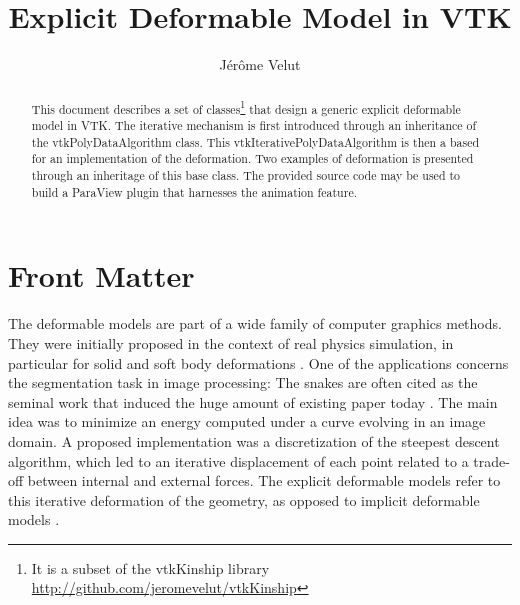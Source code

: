 \documentclass{InsightArticle}
\title{Explicit Deformable Model in VTK}
\author{J\'er\^ome Velut}
\newcommand{\IJhandlerIDnumber}{3251}
\begin{document}
%
% 
\IJhandlefooter{\IJhandlerIDnumber}


\ifpdf
\else
\fi


\maketitle


\ifhtml
\chapter*{Front Matter\label{front}}
\fi


\begin{abstract}
\noindent
This document describes a set of classes\footnote{It is a subset of the
vtkKinship library \url{http://github.com/jeromevelut/vtkKinship}} that 
design a generic explicit deformable model in VTK. The iterative mechanism
is first introduced through an inheritance of the vtkPolyDataAlgorithm class. 
This vtkIterativePolyDataAlgorithm is then a based for an implementation of the
deformation. Two examples of deformation is presented through an inheritage of
this base class. The provided source code may be used to build a ParaView plugin
that harnesses the animation feature.
\end{abstract}

\IJhandlenote{\IJhandlerIDnumber}

\tableofcontents

The deformable models are part of a wide family of computer graphics methods.
They were initially proposed in the context of real physics simulation, 
in particular for solid and soft body deformations \cite{TER87,TER88.3}. One of the
applications concerns the segmentation task in image processing:
The snakes \cite{KAS87} are often cited as the seminal work that induced the
huge amount of existing paper today \cite{MON01}. The main idea was to minimize
an energy computed under a curve evolving in an image domain. A proposed 
implementation was a discretization of the steepest descent algorithm, which
led to an iterative displacement of each point related to a trade-off between
internal and external forces. The explicit deformable models refer to this 
iterative deformation of the geometry, as opposed to implicit deformable
models \cite{}.
\end{document}
